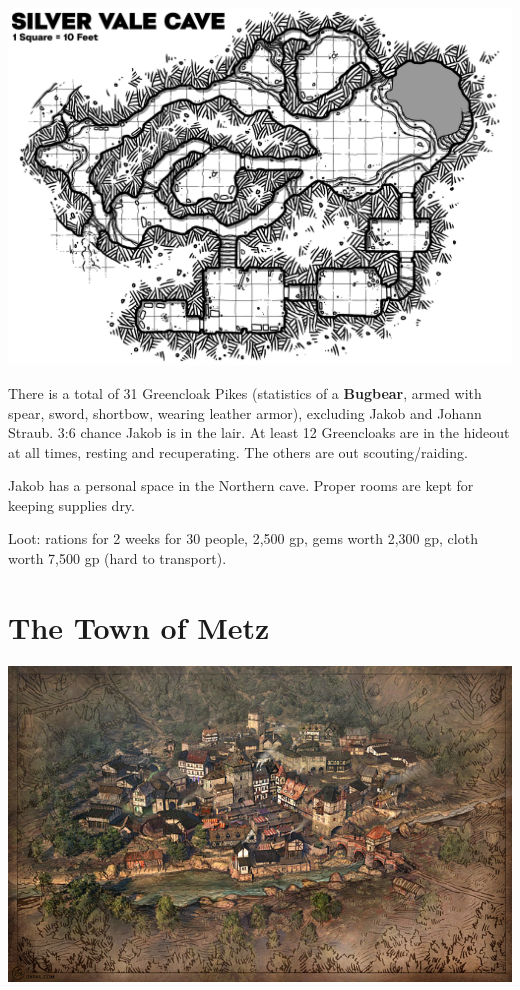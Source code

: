 \documentclass[
]{book}
\begin{document}
\begin{center}\includegraphics[width=1\linewidth]{graphics/longboat-mountain-silver-vale-cave} \end{center}

There is a total of 31 Greencloak Pikes (statistics of a \textbf{Bugbear}, armed with spear, sword, shortbow, wearing leather armor), excluding Jakob and Johann Straub. 3:6 chance Jakob is in the lair. At least 12 Greencloaks are in the hideout at all times, resting and recuperating. The others are out scouting/raiding.

Jakob has a personal space in the Northern cave. Proper rooms are kept for keeping supplies dry.

Loot: rations for 2 weeks for 30 people, 2,500 gp, gems worth 2,300 gp, cloth worth 7,500 gp (hard to transport).

\chapter{The Town of Metz}\label{metz}

\begin{center}\includegraphics[width=1\linewidth]{graphics/medieval_town_map_blog} \end{center}
\end{document}
